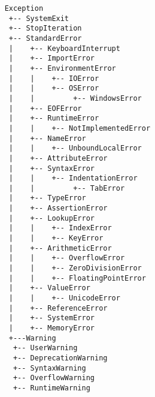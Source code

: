 \begin{verbatim}
    Exception
     +-- SystemExit
     +-- StopIteration
     +-- StandardError
     |    +-- KeyboardInterrupt
     |    +-- ImportError
     |    +-- EnvironmentError
     |    |    +-- IOError
     |    |    +-- OSError
     |    |         +-- WindowsError
     |    +-- EOFError
     |    +-- RuntimeError
     |    |    +-- NotImplementedError
     |    +-- NameError
     |    |    +-- UnboundLocalError
     |    +-- AttributeError
     |    +-- SyntaxError
     |    |    +-- IndentationError
     |    |         +-- TabError
     |    +-- TypeError
     |    +-- AssertionError
     |    +-- LookupError
     |    |    +-- IndexError
     |    |    +-- KeyError
     |    +-- ArithmeticError
     |    |    +-- OverflowError
     |    |    +-- ZeroDivisionError
     |    |    +-- FloatingPointError
     |    +-- ValueError
     |    |    +-- UnicodeError
     |    +-- ReferenceError
     |    +-- SystemError
     |    +-- MemoryError
     +---Warning
	  +-- UserWarning
	  +-- DeprecationWarning
	  +-- SyntaxWarning
	  +-- OverflowWarning
	  +-- RuntimeWarning
\end{verbatim}
